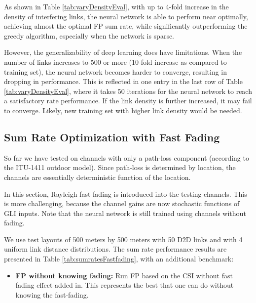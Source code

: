\documentclass[journal,12pt,onecolumn,draftclsnofoot,]{IEEEtran}
\begin{document}
As shown in Table \ref{tab:varyDensityEval}, with up to 4-fold increase in 
the density of interfering links, the neural network is able to perform near
optimally, achieving almost the optimal FP sum rate, while significantly
outperforming the greedy algorithm, especially when the network is sparse. 

However, the generalizability of deep learning does have limitations. When 
the number of links increases to 500 or more (10-fold increase as compared to
training set), the neural network becomes harder to converge, resulting in
dropping in performance. This is reflected in one entry in the last row of
Table \ref{tab:varyDensityEval}, where it takes 50 iterations for the neural
network to reach a satisfactory rate performance. If the link density is
further increased, it may fail to converge. Likely, new training set with
higher link density would be needed. 


\subsection{Sum Rate Optimization with Fast Fading}

So far we have tested on channels with only a path-loss component (according
to the ITU-1411 outdoor model). Since path-loss is determined by location,
the channels are essentially deterministic function of the location.

In this section, Rayleigh fast fading is introduced into the testing channels.
This is more challenging, because the channel gains are now stochastic
functions of GLI inputs. Note that the neural network is still trained using
channels without fading. 

We use test layouts of 500 meters by 500 meters with 50 D2D links and 
with 4 uniform link distance distributions. The sum rate performance results
are presented in Table \ref{tab:sumratesFastfading}, with an additional benchmark:
\begin{itemize}
    \item {\bf FP without knowing fading:} Run FP based on the CSI without
fast fading effect added in. This represents the best that one
can do without knowing the fast-fading.  
\end{itemize}
\end{document}
